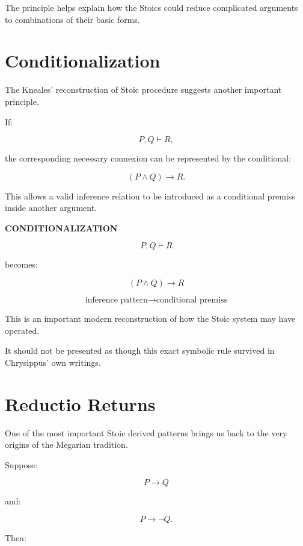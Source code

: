 \documentclass[11pt]{article}
\begin{document}
The principle helps explain how the Stoics could reduce
complicated arguments to combinations of their basic forms.

\section{Conditionalization}

The Kneales' reconstruction of Stoic procedure suggests another
important principle.

If:

\[
P,Q\vdash R,
\]

the corresponding necessary connexion can be represented by the
conditional:

\[
(P\land Q)\rightarrow R.
\]

This allows a valid inference relation to be introduced as a
conditional premiss inside another argument.

\begin{whiteboard}
\textbf{CONDITIONALIZATION}

\[
P,Q\vdash R
\]

becomes:

\[
\boxed{
(P\land Q)\rightarrow R
}
\]

\[
\text{inference pattern}
\rightarrow
\text{conditional premiss}
\]
\end{whiteboard}

This is an important modern reconstruction of how the Stoic
system may have operated.

It should not be presented as though this exact symbolic rule
survived in Chrysippus' own writings.

\section{Reductio Returns}

One of the most important Stoic derived patterns brings us back
to the very origins of the Megarian tradition.

Suppose:

\[
P\rightarrow Q
\]

and:

\[
P\rightarrow\neg Q.
\]

Then:
\end{document}
